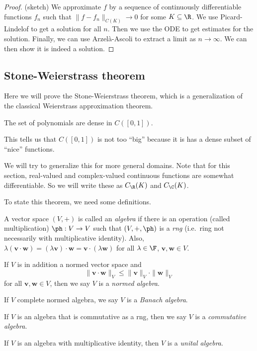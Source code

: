 \documentclass[a4paper]{article}
\begin{document}
\begin{proof}(sketch)
  We approximate $f$ by a sequence of continuously differentiable functions $f_n$ such that $\|f - f_n\|_{C(K)} \to 0$ for some $K\subseteq \R$. We use Picard-Lindelof to get a solution for all $n$. Then we use the ODE to get estimates for the solution. Finally, we can use Arzel\`a-Ascoli to extract a limit as $n \to \infty$. We can then show it is indeed a solution.
\end{proof}

\subsection{Stone-Weierstrass theorem}
Here we will prove the Stone-Weierstrass theorem, which is a generalization of the classical Weierstrass approximation theorem.
\begin{thm}
  The set of polynomials are dense in $C([0, 1])$.
\end{thm}
This tells us that $C([0, 1])$ is not too ``big'' because it is has a dense subset of ``nice'' functions.

We will try to generalize this for more general domains. Note that for this section, real-valued and complex-valued continuous functions are somewhat differentiable. So we will write these as $C_{\R}(K)$ and $C_{\C}(K)$.

To state this theorem, we need some definitions.

\begin{defi}[Algebra]
  A vector space $(V, +)$ is called an \emph{algebra} if there is an operation (called multiplication) $\ph: V \to V$ such that $(V, +, \ph)$ is a \emph{rng} (i.e.\ ring not necessarily with multiplicative identity). Also, $\lambda(\mathbf{v}\cdot \mathbf{w}) = (\lambda \mathbf{v})\cdot \mathbf{w} = \mathbf{v}\cdot (\lambda \mathbf{w})$ for all $\lambda \in \F$, $\mathbf{v}, \mathbf{w} \in V$.

  If $V$ is in addition a normed vector space and
  \[
    \|\mathbf{v}\cdot \mathbf{w}\|_V \leq \|\mathbf{v}\|_V \cdot \|\mathbf{w}\|_V
  \]
  for all $\mathbf{v}, \mathbf{w} \in V$, then we say $V$ is a \emph{normed algebra}.

  If $V$ complete normed algebra, we say $V$ is a \emph{Banach algebra}.

  If $V$ is an algebra that is commutative as a rng, then we say $V$ is a \emph{commutative algebra}.

  If $V$ is an algebra with multiplicative identity, then $V$ is a \emph{unital algebra}.
\end{defi}
\end{document}
